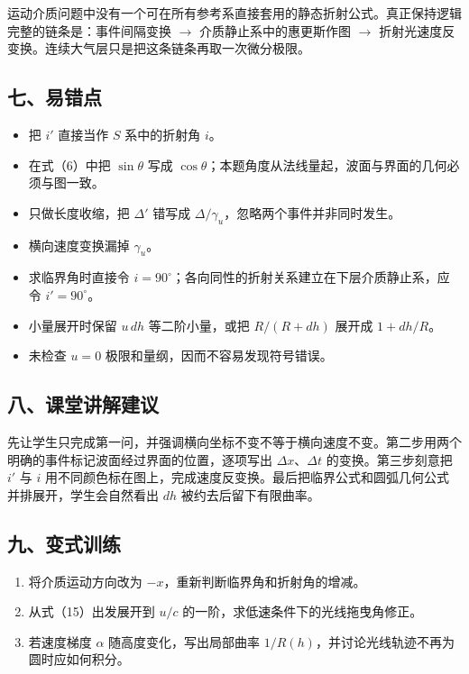 \documentclass[12pt,a4paper,UTF8]{ctexart}
\newcommand{\tightlist}{\setlength{\itemsep}{0pt}\setlength{\parskip}{0pt}}
\begin{document}
运动介质问题中没有一个可在所有参考系直接套用的静态折射公式。真正保持逻辑完整的链条是：事件间隔变换
\(\rightarrow\) 介质静止系中的惠更斯作图 \(\rightarrow\)
折射光速度反变换。连续大气层只是把这条链条再取一次微分极限。

\subsection{七、易错点}\label{ux4e03ux6613ux9519ux70b9-6}

\begin{itemize}
\tightlist
\item
  把 \(i'\) 直接当作 \(S\) 系中的折射角 \(i\)。
\item
  在式（6）中把 \(\sin\theta\) 写成
  \(\cos\theta\)；本题角度从法线量起，波面与界面的几何必须与图一致。
\item
  只做长度收缩，把 \(\Delta'\) 错写成
  \(\Delta/\gamma_u\)，忽略两个事件并非同时发生。
\item
  横向速度变换漏掉 \(\gamma_u\)。
\item
  求临界角时直接令
  \(i=90^\circ\)；各向同性的折射关系建立在下层介质静止系，应令
  \(i'=90^\circ\)。
\item
  小量展开时保留 \(u\,dh\) 等二阶小量，或把 \(R/(R+dh)\) 展开成
  \(1+dh/R\)。
\item
  未检查 \(u=0\) 极限和量纲，因而不容易发现符号错误。
\end{itemize}

\subsection{八、课堂讲解建议}\label{ux516bux8bfeux5802ux8bb2ux89e3ux5efaux8bae-6}

先让学生只完成第一问，并强调横向坐标不变不等于横向速度不变。第二步用两个明确的事件标记波面经过界面的位置，逐项写出
\(\Delta x\)、\(\Delta t\) 的变换。第三步刻意把 \(i'\) 与 \(i\)
用不同颜色标在图上，完成速度反变换。最后把临界公式和圆弧几何公式并排展开，学生会自然看出
\(dh\) 被约去后留下有限曲率。

\subsection{九、变式训练}\label{ux4e5dux53d8ux5f0fux8badux7ec3-6}

\begin{enumerate}
\def\labelenumi{\arabic{enumi}.}
\tightlist
\item
  将介质运动方向改为 \(-x\)，重新判断临界角和折射角的增减。
\item
  从式（15）出发展开到 \(u/c\) 的一阶，求低速条件下的光线拖曳角修正。
\item
  若速度梯度 \(\alpha\) 随高度变化，写出局部曲率
  \(1/R(h)\)，并讨论光线轨迹不再为圆时应如何积分。
\end{enumerate}
\end{document}

